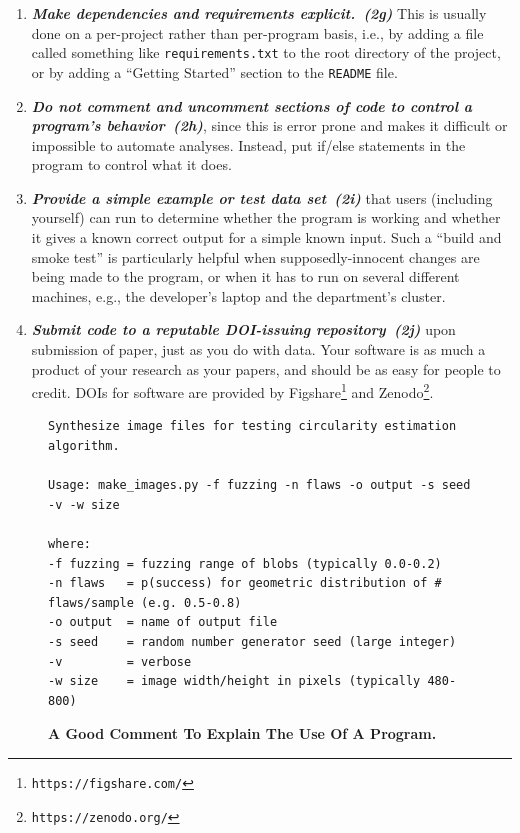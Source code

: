 \documentclass[10pt,letterpaper]{article}
\newcommand{\withurl}[2]{{#1}\footnote{{\texttt{#2}}}}
\newcommand{\practice}[2]{\textbf{\emph{{#2}~({#1})}}}
\begin{document}
\begin{enumerate}
\begin{quote}
  \end{quote}

\item
  \practice{2g}{Make dependencies and requirements explicit.} This is
  usually done on a per-project rather than per-program basis, i.e.,
  by adding a file called something like \texttt{requirements.txt} to
  the root directory of the project, or by adding a ``Getting
  Started'' section to the \texttt{README} file.

\item
  \practice{2h}{Do not comment and uncomment sections of code to control
    a program's behavior}, since this is error prone and makes it
  difficult or impossible to automate analyses. Instead, put if/else
  statements in the program to control what it does.

\item
  \practice{2i}{Provide a simple example or test data set} that users
  (including yourself) can run to determine whether the program is
  working and whether it gives a known correct output for a
  simple known input. Such a ``build and smoke test'' is particularly
  helpful when supposedly-innocent changes are being made to the
  program, or when it has to run on several different machines, e.g.,
  the developer's laptop and the department's cluster.

\item
  \practice{2j}{Submit code to a reputable DOI-issuing repository} upon
  submission of paper, just as you do with data. Your software is as
  much a product of your research as your papers, and should be as
  easy for people to credit. DOIs for software are provided by
  \withurl{Figshare}{https://figshare.com/} and
  \withurl{Zenodo}{https://zenodo.org/}.

\end{enumerate}

\begin{figure}
\caption{\textbf{A Good Comment To Explain The Use Of A Program.}}
{\small
\begin{verbatim}
Synthesize image files for testing circularity estimation algorithm.

Usage: make_images.py -f fuzzing -n flaws -o output -s seed -v -w size

where:
-f fuzzing = fuzzing range of blobs (typically 0.0-0.2)
-n flaws   = p(success) for geometric distribution of # flaws/sample (e.g. 0.5-0.8)
-o output  = name of output file
-s seed    = random number generator seed (large integer)
-v         = verbose
-w size    = image width/height in pixels (typically 480-800)
\end{verbatim}
}
\label{fig:comment}
\end{figure}
\end{document}
